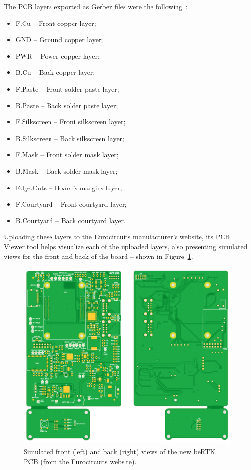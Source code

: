 The PCB layers exported as Gerber files were the following~\cite{pcbnew_kicad}:
\begin{itemize}
	\item F.Cu -- Front copper layer;
	\item GND -- Ground copper layer;
	\item PWR -- Power copper layer;
	\item B.Cu -- Back copper layer;
	\item F.Paste -- Front solder paste layer;
	\item B.Paste -- Back solder paste layer;
	\item F.Silkscreen -- Front silkscreen layer;
	\item B.Silkscreen -- Back silkscreen layer;
	\item F.Mask -- Front solder mask layer;
	\item B.Mask -- Back solder mask layer;
	\item Edge.Cuts -- Board's margins layer;
	\item F.Courtyard -- Front courtyard layer;
	\item B.Courtyard -- Back courtyard layer.
\end{itemize}
\noindent Uploading these layers to the Eurocircuits manufacturer's website, its PCB Viewer tool helps visualize each of the uploaded layers, also presenting simulated views for the front and back of the board -- shown in Figure~\ref{fig:EC_Front_Back_views}.

\begin{figure}[h]
	\centering
	\includegraphics[width=1.0\textwidth]{Chapters/Figures/chapter5/prototype/EC_Front_Back_views.png}
	\caption{Simulated front (left) and back (right) views of the new beRTK\textsuperscript{\textregistered} PCB (from the Eurocircuits website).}
	\label{fig:EC_Front_Back_views}
\end{figure}

